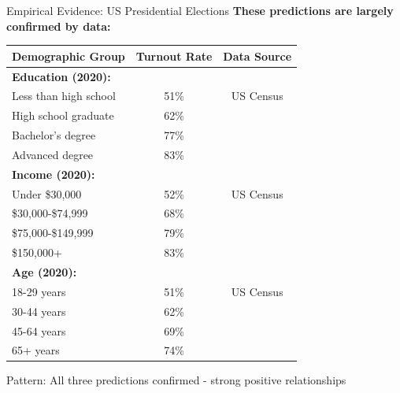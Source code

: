 \documentclass[10pt]{beamer}
\begin{document}
\begin{frame}{Empirical Evidence: US Presidential Elections}
\textbf{These predictions are largely confirmed by data:}

\begin{table}
\centering
\footnotesize
\begin{tabular}{lcc}
\toprule
\textbf{Demographic Group} & \textbf{Turnout Rate} & \textbf{Data Source} \\
\midrule
\multicolumn{3}{l}{\textbf{Education (2020):}} \\
Less than high school & 51\% & US Census \\
High school graduate & 62\% & \\
Bachelor's degree & 77\% & \\
Advanced degree & 83\% & \\
\midrule
\multicolumn{3}{l}{\textbf{Income (2020):}} \\
Under \$30,000 & 52\% & US Census \\
\$30,000-\$74,999 & 68\% & \\
\$75,000-\$149,999 & 79\% & \\
\$150,000+ & 83\% & \\
\midrule
\multicolumn{3}{l}{\textbf{Age (2020):}} \\
18-29 years & 51\% & US Census \\
30-44 years & 62\% & \\
45-64 years & 69\% & \\
65+ years & 74\% & \\
\bottomrule
\end{tabular}
\end{table}

\alert{Pattern:} All three predictions confirmed - strong positive relationships
\end{frame}
\end{document}
